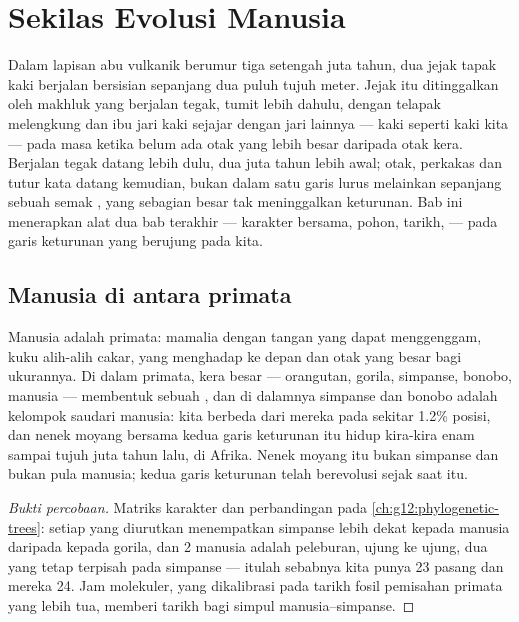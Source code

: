 \chapter{Sekilas Evolusi Manusia}\label{ch:g12:human-evolution}

Dalam lapisan abu vulkanik berumur tiga setengah juta tahun, dua jejak
tapak kaki berjalan bersisian sepanjang dua puluh tujuh meter. Jejak
itu ditinggalkan oleh makhluk yang berjalan tegak, tumit lebih dahulu,
dengan telapak melengkung dan ibu jari kaki sejajar dengan jari
lainnya --- kaki seperti kaki kita --- pada masa ketika belum ada otak
yang lebih besar daripada otak kera. Berjalan tegak datang lebih dulu,
dua juta tahun lebih awal; otak, perkakas dan tutur kata datang
kemudian, bukan dalam satu garis lurus melainkan sepanjang sebuah
semak , yang sebagian besar tak meninggalkan keturunan. Bab ini
menerapkan alat dua bab terakhir --- karakter bersama, pohon, tarikh,
 --- pada garis keturunan yang berujung pada kita.

\section{Manusia di antara primata}

\begin{proposition}\label{prop:g12:human-evolution:place}
Manusia adalah primata: mamalia dengan tangan yang dapat menggenggam,
kuku alih-alih cakar,  yang menghadap ke depan dan otak yang besar
bagi ukurannya. Di dalam primata, kera besar --- orangutan, gorila,
simpanse, bonobo, manusia --- membentuk sebuah , dan di dalamnya
simpanse dan bonobo adalah kelompok saudari manusia:  kita berbeda
dari  mereka pada sekitar 1.2\% posisi, dan nenek moyang bersama
kedua garis keturunan itu hidup kira-kira enam sampai tujuh juta tahun
lalu, di Afrika. Nenek moyang itu bukan simpanse dan bukan pula
manusia; kedua garis keturunan telah berevolusi sejak saat itu.
\end{proposition}
\begin{proof}[Bukti percobaan]
Matriks karakter dan perbandingan  pada
\cref{ch:g12:phylogenetic-trees}: setiap  yang diurutkan
menempatkan simpanse lebih dekat kepada manusia daripada kepada
gorila, dan  2 manusia adalah peleburan, ujung ke ujung, dua
 yang tetap terpisah pada simpanse --- itulah sebabnya kita
punya 23 pasang dan mereka 24. Jam molekuler, yang dikalibrasi pada
tarikh fosil pemisahan primata yang lebih tua, memberi tarikh bagi
simpul manusia--simpanse.
\end{proof}

